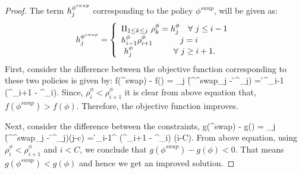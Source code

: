 \begin{proof}
The  term $h^{\phi^{swap}}_j$ corresponding to the policy $\phi^{swap}$, will be given as:
\begin{eqnarray*}
h^{\phi^{swap}}_j = \left \{  \begin{array}{llll}
\Pi_{ 1 \le k \leq j} \ \rho^\phi_k  = h_j^{\phi} \ \ \ \forall \ j \leq i-1 \\
h_{i-1}^{\phi} \rho^\phi_{i+1}   \ \ \ \ \ \ \ \ \ \ j = i \\\
h_j^{\phi}  \ \ \ \ \ \ \ \hspace{0.9cm} \forall \ j \geq i+1.
\end{array} \right . 
\end{eqnarray*}
First, consider the difference between the objective function corresponding to these two policies is given by:
\beq
f(\phi^{swap}) - f(\phi) = \sum_j (\h^{\phi^{swap}}_j - \h^\phi_j) = \h^\phi_{i-1} (\rho^\phi_{i+1} - \rho^\phi_{i}).
\eeq
Since, $\rho^\phi_i < \rho^\phi_{i+1}$ it is clear from above equation that, $f(\phi^{swap}) > f(\phi)$. Therefore, the objective function improves.

Next, consider the difference between the constraints,
\beq
g(\phi^{swap}) - g(\phi) = \sum_j (\h^{\phi^{swap}}_j - \h^\phi_j)(j-c) = \h_{i-1}^{\phi} (\rho^\phi_{i+1} - \rho^\phi_{i}) (i-C).
\eeq
From above equation, using $\rho^\phi_i < \rho^\phi_{i+1}$ and $i <C$, we conclude that $g(\phi^{swap}) - g(\phi) < 0 $. That means $g(\phi^{swap}) < g(\phi)$ and hence we get an improved solution.
\end{proof}

